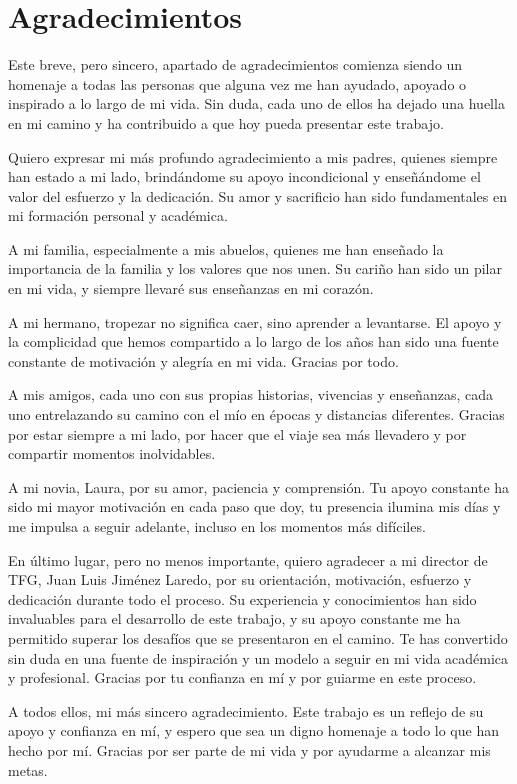 \chapter*{Agradecimientos}

Este breve, pero sincero, apartado de agradecimientos comienza siendo un homenaje a todas las personas que alguna vez me han ayudado, apoyado o inspirado a lo largo de mi vida. Sin duda, cada uno de ellos ha dejado una huella en mi camino y ha contribuido a que hoy pueda presentar este trabajo.

Quiero expresar mi más profundo agradecimiento a mis padres, quienes siempre han estado a mi lado, brindándome su apoyo incondicional y enseñándome el valor del esfuerzo y la dedicación. Su amor y sacrificio han sido fundamentales en mi formación personal y académica.

A mi familia, especialmente a mis abuelos, quienes me han enseñado la importancia de la familia y los valores que nos unen. Su cariño han sido un pilar en mi vida, y siempre llevaré sus enseñanzas en mi corazón.

A mi hermano, tropezar no significa caer, sino aprender a levantarse. El apoyo y la complicidad que hemos compartido a lo largo de los años han sido una fuente constante de motivación y alegría en mi vida. Gracias por todo.

A mis amigos, cada uno con sus propias historias, vivencias y enseñanzas, cada uno entrelazando su camino con el mío en épocas y distancias diferentes. Gracias por estar siempre a mi lado, por hacer que el viaje sea más llevadero y por compartir momentos inolvidables.

A mi novia, Laura, por su amor, paciencia y comprensión. Tu apoyo constante ha sido mi mayor motivación en cada paso que doy, tu presencia ilumina mis días y me impulsa a seguir adelante, incluso en los momentos más difíciles.

En último lugar, pero no menos importante, quiero agradecer a mi director de TFG, Juan Luis Jiménez Laredo, por su orientación, motivación, esfuerzo y dedicación durante todo el proceso. Su experiencia y conocimientos han sido invaluables para el desarrollo de este trabajo, y su apoyo constante me ha permitido superar los desafíos que se presentaron en el camino. Te has convertido sin duda en una fuente de inspiración y un modelo a seguir en mi vida académica y profesional. Gracias por tu confianza en mí y por guiarme en este proceso.

A todos ellos, mi más sincero agradecimiento. Este trabajo es un reflejo de su apoyo y confianza en mí, y espero que sea un digno homenaje a todo lo que han hecho por mí. Gracias por ser parte de mi vida y por ayudarme a alcanzar mis metas.